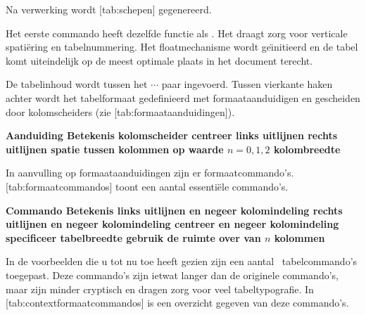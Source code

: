\typebuffer

Na verwerking wordt [tab:schepen] gegenereerd.

\haalbuffer

Het eerste commando \type{\plaatstabel} heeft dezelfde
functie als \type{\plaatsfiguur}. Het draagt zorg voor
verticale spati\"ering en tabelnummering. Het floatmechanisme
wordt ge\"{\i}nitieerd en de tabel komt uiteindelijk op de meest
optimale plaats in het document terecht.

De tabelinhoud wordt tussen het \type{\starttabel} $\cdots$
\type{\stoptabel} paar ingevoerd. Tussen vierkante haken
achter \type{\starttabel} wordt het tabelformaat
gedefinieerd met formaataanduidigen en gescheiden door
kolomscheiders \type{|} (zie
[tab:formaataanduidingen]).

\starttabel[|l|l|]
\HL
\NC \bf Aanduiding \NC \bf Betekenis \NC\SR
\HL
\NC \type{|}    \NC kolomscheider                                  \NC\FR
\NC {}    \NC centreer                                       \NC\MR
\NC {}    \NC links uitlijnen                                \NC\MR
\NC {}    \NC rechts uitlijnen                               \NC\MR
\NC {} \NC spatie tussen kolommen op waarde $n = 0, 1, 2$ \NC\MR
\NC {}  \NC kolombreedte                                   \NC\LR
\HL
\stoptabel

In aanvulling op formaataanduidingen zijn er
formaatcommando's. [tab:formaatcommandos] toont
een aantal essenti\"ele commando's.

\starttabel[|l|l|]
\HL
\NC \bf Commando              \NC \bf Betekenis                            \NC\SR
\HL
\NC \type{\JustLeft}          \NC links uitlijnen en negeer kolomindeling  \NC\FR
\NC \type{\JustRight}         \NC rechts uitlijnen en negeer kolomindeling \NC\MR
\NC \type{\JustCenter}        \NC centreer en negeer kolomindeling         \NC\MR
\NC \type{\SetTableToWidth{}} \NC specificeer tabelbreedte                 \NC\MR
\NC {}            \NC gebruik de ruimte over van $n$ kolommen  \NC\LR
\HL
\stoptabel

In de voorbeelden die u tot nu toe heeft gezien zijn een
aantal \CONTEXT\ tabelcommando's toegepast. Deze commando's
zijn ietwat langer dan de originele commando's, maar zijn
minder cryptisch en dragen zorg voor veel tabeltypografie.
In [tab:contextformaatcommandos] is een overzicht
gegeven van deze commando's.


